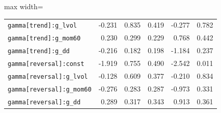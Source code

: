 \begin{table}[!htbp]
\begin{adjustbox}{max width=\textwidth}
\begin{tabular}{lrrrrr}
\texttt{gamma[trend]:g\_lvol} & -0.231 & 0.835 & 0.419 & -0.277 & 0.782\\
\texttt{gamma[trend]:g\_mom60} & 0.230 & 0.299 & 0.229 & 0.768 & 0.442\\
\texttt{gamma[trend]:g\_dd} & -0.216 & 0.182 & 0.198 & -1.184 & 0.237\\
\texttt{gamma[reversal]:const} & -1.919 & 0.755 & 0.490 & -2.542 & 0.011\\
\texttt{gamma[reversal]:g\_lvol} & -0.128 & 0.609 & 0.377 & -0.210 & 0.834\\
\texttt{gamma[reversal]:g\_mom60} & -0.276 & 0.283 & 0.287 & -0.973 & 0.331\\
\texttt{gamma[reversal]:g\_dd} & 0.289 & 0.317 & 0.343 & 0.913 & 0.361\\
\bottomrule
\end{tabular}
\end{adjustbox}
\end{table}